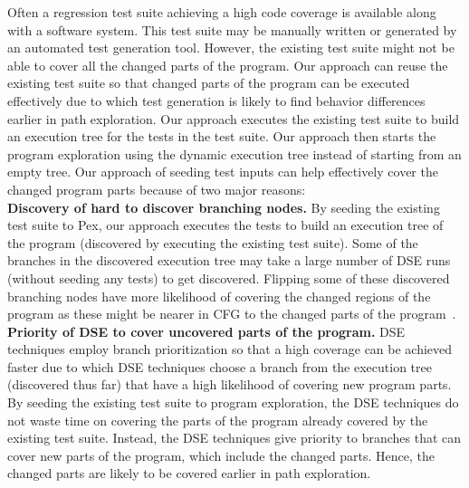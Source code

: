 Often a regression test suite achieving a high code coverage is available along with a software system. This test suite may be manually written or generated by an automated test generation tool. However, the existing test suite might not be able to cover all the changed parts of the program. Our approach can reuse the existing test suite so that changed parts of the program can be executed effectively due to which test generation is likely to find behavior differences earlier in path exploration. Our approach executes the existing test suite to build an execution
tree for the tests in the test suite. Our approach then starts the program
exploration using the dynamic execution tree instead of starting from an empty
tree. Our approach of seeding test inputs can help effectively cover the changed program parts because of two major reasons:
\\ \textbf{Discovery of hard to discover branching nodes.} By seeding the existing test suite to Pex, our approach executes the tests to build an execution tree of the program (discovered by executing the existing test suite). Some of the branches in the discovered execution tree may take a large number of DSE runs (without seeding any tests) to get discovered. Flipping some of these discovered branching nodes have more likelihood of covering the changed regions of the program as these might be nearer in CFG to the changed parts of the program~\cite{burnim}.
\\ \textbf{Priority of DSE to cover uncovered parts of the program.} DSE techniques employ branch prioritization so that a high coverage can be achieved faster due to which DSE techniques choose a branch from the execution tree (discovered thus far) that have a high likelihood of covering new program parts. By seeding the existing test suite to program exploration, the DSE techniques do not waste time on covering the parts of the program already covered by the existing test suite. Instead, the DSE techniques give priority to branches that can cover new parts of the program, which include the changed parts. Hence, the changed parts are likely to be covered earlier in path exploration.
 


 
 